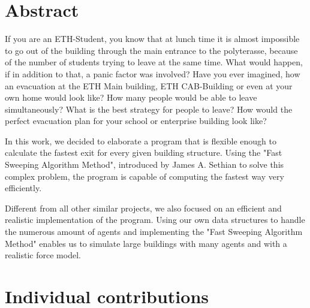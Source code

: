 \documentclass[11pt]{article}
\begin{document}






\tableofcontents

\newpage




\section{Abstract}

If you are an ETH-Student, you know that at lunch time it is almost impossible 
to go out of the building through the main entrance to the polyterasse, because
of the number of students trying to leave at the same time. What would happen,
if in addition to that, a panic factor was involved? Have you ever imagined, how
an evacuation at the ETH Main building, ETH CAB-Building or even at your own home
would look like? How many people would be able to leave simultaneously? What is the
best strategy for people to leave? How would the perfect evacuation plan for your
school or enterprise building look like?

In this work, we decided to elaborate a program that is flexible enough to
calculate the fastest exit for every given building structure. Using the "Fast
Sweeping Algorithm Method", introduced by James A. Sethian\cite{Zhao04afast} to
solve this complex problem, the program is capable of computing the fastest way
very efficiently.

Different from all other similar projects, we also focused on an efficient and
realistic implementation of the program. Using our own data structures to
handle the numerous amount of agents and implementing the "Fast Sweeping
Algorithm Method" enables us to simulate large buildings with many agents and
with a realistic force model.


\section{Individual contributions}
\end{document}
